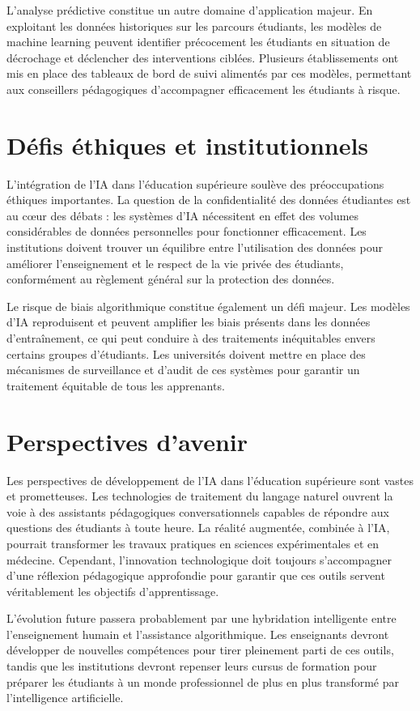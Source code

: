 \documentclass[
    language=french,
    doctype=article,
]{../../omnilatex}
\begin{document}
L'analyse prédictive constitue un autre domaine d'application majeur. En exploitant les données historiques sur les parcours étudiants, les modèles de machine learning peuvent identifier précocement les étudiants en situation de décrochage et déclencher des interventions ciblées. Plusieurs établissements ont mis en place des tableaux de bord de suivi alimentés par ces modèles, permettant aux conseillers pédagogiques d'accompagner efficacement les étudiants à risque.

\section{Défis éthiques et institutionnels}
L'intégration de l'IA dans l'éducation supérieure soulève des préoccupations éthiques importantes. La question de la confidentialité des données étudiantes est au cœur des débats : les systèmes d'IA nécessitent en effet des volumes considérables de données personnelles pour fonctionner efficacement. Les institutions doivent trouver un équilibre entre l'utilisation des données pour améliorer l'enseignement et le respect de la vie privée des étudiants, conformément au règlement général sur la protection des données.

Le risque de biais algorithmique constitue également un défi majeur. Les modèles d'IA reproduisent et peuvent amplifier les biais présents dans les données d'entraînement, ce qui peut conduire à des traitements inéquitables envers certains groupes d'étudiants. Les universités doivent mettre en place des mécanismes de surveillance et d'audit de ces systèmes pour garantir un traitement équitable de tous les apprenants.

\section{Perspectives d'avenir}
Les perspectives de développement de l'IA dans l'éducation supérieure sont vastes et prometteuses. Les technologies de traitement du langage naturel ouvrent la voie à des assistants pédagogiques conversationnels capables de répondre aux questions des étudiants à toute heure. La réalité augmentée, combinée à l'IA, pourrait transformer les travaux pratiques en sciences expérimentales et en médecine. Cependant, l'innovation technologique doit toujours s'accompagner d'une réflexion pédagogique approfondie pour garantir que ces outils servent véritablement les objectifs d'apprentissage.

L'évolution future passera probablement par une hybridation intelligente entre l'enseignement humain et l'assistance algorithmique. Les enseignants devront développer de nouvelles compétences pour tirer pleinement parti de ces outils, tandis que les institutions devront repenser leurs cursus de formation pour préparer les étudiants à un monde professionnel de plus en plus transformé par l'intelligence artificielle.
\end{document}
